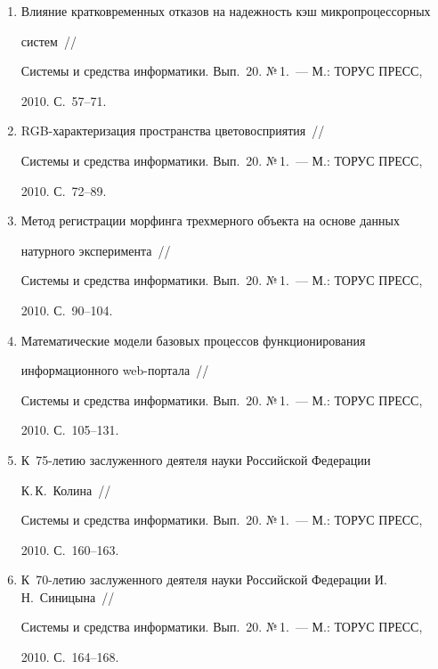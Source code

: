 \begin{enumerate}[1.]
\item {}


Влияние кратковременных отказов на надежность кэш микропроцессорных 


систем~/\!\!/


Системы и средства информатики. Вып.~20. №\,1.~--- М.: ТОРУС ПРЕСС, 


2010. С.~57--71.


\item {}


RGB-характеризация пространства цветовосприятия~/\!\!/


Системы и средства информатики. Вып.~20. №\,1.~--- М.: ТОРУС ПРЕСС, 


2010. С.~72--89.


\item {}


Метод регистрации морфинга трехмерного объекта на основе данных 


натурного эксперимента~/\!\!/


Системы и средства информатики. Вып.~20. №\,1.~--- М.: ТОРУС ПРЕСС, 


2010. С.~90--104.


\item {}


Математические модели базовых процессов функционирования 


информационного web-портала~/\!\!/


Системы и средства информатики. Вып.~20. №\,1.~--- М.: ТОРУС ПРЕСС, 


2010. С.~105--131.


\item {}


К~75-ле\-тию заслуженного деятеля науки Российской Федерации 


К.\,К.~Колина~/\!\!/


Системы и средства информатики. Вып.~20. №\,1.~--- М.: ТОРУС ПРЕСС, 


2010. С.~160--163.


\item {}


К~70-ле\-тию заслуженного деятеля науки Российской Федерации И.\,Н.~Синицына~/\!\!/


Системы и средства информатики. Вып.~20. №\,1.~--- М.: ТОРУС ПРЕСС, 


2010. С.~164--168.


  \end{enumerate}


